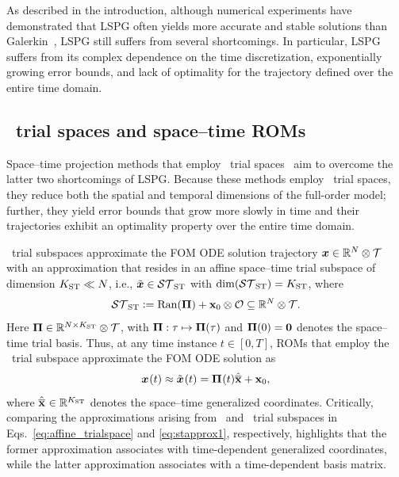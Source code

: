 \documentclass[3p,computermodern,10pt]{elsarticle}
\begin{document}
As described in the introduction, although numerical experiments have
demonstrated that LSPG often yields more accurate and stable
solutions than Galerkin~\cite{bui_thesis,carlberg_lspg_v_galerkin,carlberg_gnat,carlberg_thesis,parish_apg},
LSPG still suffers from several shortcomings. In particular, LSPG suffers from its complex
dependence on the time discretization, exponentially growing error bounds, and
lack of optimality for the trajectory defined over the entire time domain.

\subsection{\spaceTimeAcronym\ trial spaces and space--time ROMs}

Space--time projection methods that employ \spaceTimeAcronym\ trial
spaces~\cite{choi_stlspg,constantine_strom,URBAN2012203,Yano2014ASC,benner_st,bui_thesis}
aim to overcome the latter two shortcomings of LSPG. Because these methods employ \spaceTimeAcronym\ trial
spaces, they reduce both the spatial and temporal dimensions of the full-order
model; further, they yield error bounds that grow more slowly in time and
their trajectories exhibit an optimality property over the entire time domain. 

\spaceTimeAcronym\ trial subspaces approximate the FOM ODE solution
trajectory
	${\boldsymbol x}\in\mathbb{R}^{N}\otimes \mathcal{T}$ with an approximation that resides in an
	affine space--time trial subspace of dimension $K_{\text{ST}}\ll N$, i.e., 
	$\tilde{\boldsymbol x}\in \mathcal{ ST }_{\text{ST}}$ with $\dim(\mathcal{ ST }_{\text{ST}}) =K_{\text{ST}} $, where
\begin{equation}\label{eq:sttrialspace_def}
 \mathcal{ ST }_{\text{ST}} \vcentcolon= 
	\mathrm{Ran}(\boldsymbol \Pi) + 
	{{\mathbf{x}}_0}\otimes\mathcal{O}
	\subseteq \mathbb{R}^{N} \otimes \mathcal{T}.
\end{equation}
Here $\boldsymbol \Pi \in \mathbb{R}^{N \times K_{\text{ST}}} \otimes \mathcal{T}$, with $\boldsymbol \Pi:\tau\mapsto\boldsymbol \Pi(\tau)$ and $\boldsymbol \Pi(0) =
\boldsymbol 0$
denotes the space--time trial basis. 
Thus, at any time instance $t\in[0,T]$, ROMs that employ the
\spaceTimeAcronym\ trial subspace approximate the FOM ODE solution as
\begin{equation}\label{eq:stapprox1}
 {\boldsymbol x}^{}(t) \approx \tilde{\boldsymbol x}^{}(t)  = \boldsymbol \Pi^{}(t) \hat{\mathbf{\overline{x}}} + {{\mathbf{x}}_0},
\end{equation}
where $\hat{\mathbf{\overline{x}}}^{} \in \mathbb{R}^{K_{\text{ST}}}$ denotes the space--time generalized coordinates. 
Critically, comparing the approximations arising from \spatialAcronym\ and
\spaceTimeAcronym\ trial subspaces in Eqs.~\eqref{eq:affine_trialspace} and \eqref{eq:stapprox1}, respectively,
highlights that the former approximation associates with time-dependent
generalized coordinates, while the latter approximation associates with a
time-dependent basis matrix.
\end{document}
